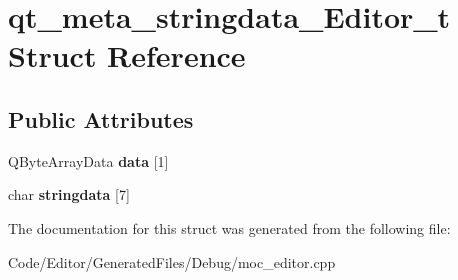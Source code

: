 \hypertarget{structqt__meta__stringdata___editor__t}{}\section{qt\+\_\+meta\+\_\+stringdata\+\_\+\+Editor\+\_\+t Struct Reference}
\label{structqt__meta__stringdata___editor__t}
\subsection*{Public Attributes}
\begin{DoxyCompactItemize}
\item 
Q\+Byte\+Array\+Data {\bfseries data} \mbox{[}1\mbox{]}\hypertarget{structqt__meta__stringdata___editor__t_ab6e6238a16780a51fa62204e031868fa}{}\label{structqt__meta__stringdata___editor__t_ab6e6238a16780a51fa62204e031868fa}

\item 
char {\bfseries stringdata} \mbox{[}7\mbox{]}\hypertarget{structqt__meta__stringdata___editor__t_a944fc81ee5a9ae7ee0a0f3b36afdaa40}{}\label{structqt__meta__stringdata___editor__t_a944fc81ee5a9ae7ee0a0f3b36afdaa40}

\end{DoxyCompactItemize}


The documentation for this struct was generated from the following file\+:\begin{DoxyCompactItemize}
\item 
Code/\+Editor/\+Generated\+Files/\+Debug/moc\+\_\+editor.\+cpp\end{DoxyCompactItemize}
